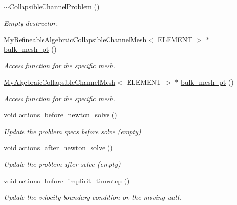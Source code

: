 \begin{DoxyCompactItemize}
\hyperlink{classCollapsibleChannelProblem_a205e3e654d3205d1d55ac46e7b63ca9d}{$\sim$\+Collapsible\+Channel\+Problem} ()
\begin{DoxyCompactList}\small\item\em Empty destructor. \end{DoxyCompactList}\item 
\hyperlink{classoomph_1_1MyRefineableAlgebraicCollapsibleChannelMesh}{My\+Refineable\+Algebraic\+Collapsible\+Channel\+Mesh}$<$ E\+L\+E\+M\+E\+NT $>$ $\ast$ \hyperlink{classCollapsibleChannelProblem_abe1a38b5c84188910435874511a877f6}{bulk\+\_\+mesh\+\_\+pt} ()
\begin{DoxyCompactList}\small\item\em Access function for the specific mesh. \end{DoxyCompactList}\item 
\hyperlink{classoomph_1_1MyAlgebraicCollapsibleChannelMesh}{My\+Algebraic\+Collapsible\+Channel\+Mesh}$<$ E\+L\+E\+M\+E\+NT $>$ $\ast$ \hyperlink{classCollapsibleChannelProblem_a411441ab7ac76c04613b1a7f558a6621}{bulk\+\_\+mesh\+\_\+pt} ()
\begin{DoxyCompactList}\small\item\em Access function for the specific mesh. \end{DoxyCompactList}\item 
void \hyperlink{classCollapsibleChannelProblem_ad7597f95eb755184ec1f9581c713ff78}{actions\+\_\+before\+\_\+newton\+\_\+solve} ()
\begin{DoxyCompactList}\small\item\em Update the problem specs before solve (empty) \end{DoxyCompactList}\item 
void \hyperlink{classCollapsibleChannelProblem_a34299672cba0f3c1db3901427eb4da4a}{actions\+\_\+after\+\_\+newton\+\_\+solve} ()
\begin{DoxyCompactList}\small\item\em Update the problem after solve (empty) \end{DoxyCompactList}\item 
void \hyperlink{classCollapsibleChannelProblem_a4c365050b11c184007b8e1cd6079147f}{actions\+\_\+before\+\_\+implicit\+\_\+timestep} ()
\begin{DoxyCompactList}\small\item\em Update the velocity boundary condition on the moving wall. \end{DoxyCompactList}\item 

\end{DoxyCompactItemize}
